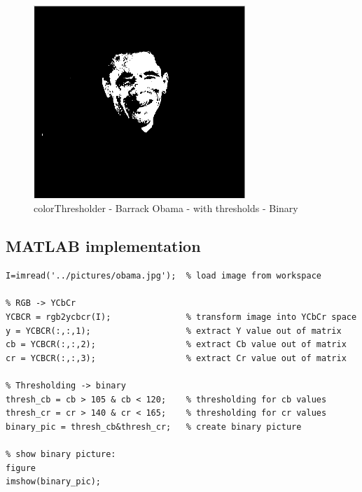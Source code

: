 \documentclass[Bachelorarbeit.tex]{subfiles}
\begin{document}
\begin{figure}[!h]
\centering
\includegraphics[width=8cm]{./img/thresholds/obama_thresholds_binary.PNG}
\caption{colorThresholder - Barrack Obama - with thresholds - Binary}
\label{obamaBin}
\end{figure}

\newpage
\subsection{MATLAB implementation}
\begin{lstlisting}[caption=Color thresholding, label= matlabColorTresholding]
I=imread('../pictures/obama.jpg');  % load image from workspace

% RGB -> YCbCr
YCBCR = rgb2ycbcr(I);               % transform image into YCbCr space
y = YCBCR(:,:,1);                   % extract Y value out of matrix
cb = YCBCR(:,:,2);                  % extract Cb value out of matrix
cr = YCBCR(:,:,3);                  % extract Cr value out of matrix

% Thresholding -> binary
thresh_cb = cb > 105 & cb < 120;    % thresholding for cb values
thresh_cr = cr > 140 & cr < 165;    % thresholding for cr values
binary_pic = thresh_cb&thresh_cr;   % create binary picture

% show binary picture:
figure
imshow(binary_pic);
\end{lstlisting}
\end{document}
